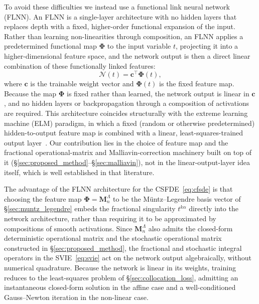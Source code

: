 \documentclass[11pt, a4paper]{article}
\theoremstyle{theoremstyle}
\theoremstyle{definitionstyle}
\begin{document}
To avoid these difficulties we instead use a functional link neural network (FLNN). An FLNN is a single-layer architecture with no hidden layers that replaces depth with a fixed, higher-order functional expansion of the input. Rather than learning non-linearities through composition, an FLNN applies a predetermined functional map $\boldsymbol \Phi$ to the input variable $t$, projecting it into a higher-dimensional feature space, and the network output is then a direct linear combination of these functionally linked features:
\begin{equation}
    \mathcal N(t) = \mathbf c^\top \boldsymbol \Phi(t),
\end{equation}
where $\mathbf c$ is the trainable weight vector and $\boldsymbol \Phi(t)$ is the fixed feature map. Because the map $\boldsymbol \Phi$ is fixed rather than learned, the network output is linear in $\mathbf c$, and no hidden layers or backpropagation through a composition of activations are required. This architecture coincides structurally with the extreme learning machine (ELM) paradigm, in which a fixed (random or otherwise predetermined) hidden-to-output feature map is combined with a linear, least-squares-trained output layer~\cite{dwivedisrinivasan2020,dongli2021}. Our contribution lies in the choice of feature map and the fractional operational-matrix and Malliavin-correction machinery built on top of it (\S\ref{sec:proposed_method}--\S\ref{sec:malliavin}), not in the linear-output-layer idea itself, which is well established in that literature.

The advantage of the FLNN architecture for the CSFDE~\eqref{eq:cfsde} is that choosing the feature map $\boldsymbol \Phi = \mathbf M_n^\Lambda$ to be the M\"untz--Legendre basis vector of \S\ref{sec:muntz_legendre} embeds the fractional singularity $t^{k\alpha}$ directly into the network architecture, rather than requiring it to be approximated by compositions of smooth activations. Since $\mathbf M_n^\Lambda$ also admits the closed-form deterministic operational matrix and the stochastic operational matrix constructed in \S\ref{sec:proposed_method}, the fractional and stochastic integral operators in the SVIE~\eqref{eq:svie} act on the network output algebraically, without numerical quadrature. Because the network is linear in its weights, training reduces to the least-squares problem of \S\ref{sec:collocation_loss}, admitting an instantaneous closed-form solution in the affine case and a well-conditioned Gauss--Newton iteration in the non-linear case.
\end{document}
